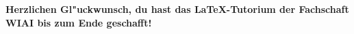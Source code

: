 



\newpage
\setcounter{page}{2}
\tableofcontents
\newpage
\listoffigures
\newpage
\listoftables
\newpage
\setcounter{page}{1}

\newpage

\newpage


\textbf{Herzlichen Gl"uckwunsch, du hast das \LaTeX -Tutorium der Fachschaft WIAI bis zum Ende geschafft!}

